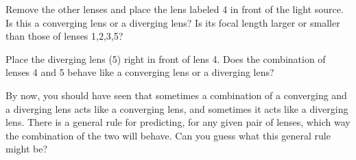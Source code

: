 \vskip 1.5in

Remove the other lenses and place the lens labeled 4 in front
of the light source.  Is this a converging lens or a diverging lens?
Is its focal length larger or smaller than those of lenses 1,2,3,5?

\vskip 1.5in

Place the diverging lens (5) right in front of lens 4.  Does the combination
of lenses 4 and 5 behave like a converging lens or a diverging lens?

\vskip 1.5in

By now, you should have seen that sometimes a combination of a converging
and a diverging lens acts like a converging lens, and sometimes it
acts like a diverging lens.  There is a general rule for predicting,
for any given pair of lenses, which way the combination of the two
will behave.  Can you guess what this general rule might be?



